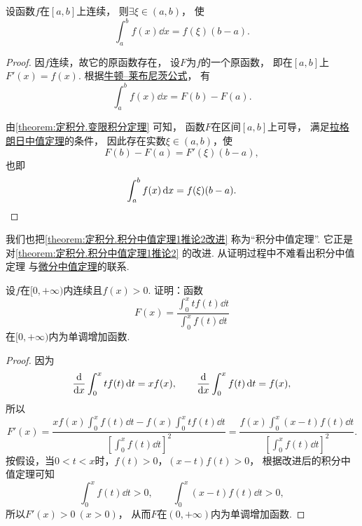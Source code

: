 \begin{proposition}\label{theorem:定积分.积分中值定理1推论2改进}
设函数\(f\)在\([a,b]\)上连续，
则\(\exists\xi\in(a,b)\)，
使\[
	\int_a^b f(x) \dd{x} = f(\xi) (b-a).
\]
\begin{proof}
因\(f\)连续，故它的原函数存在，
设\(F\)为\(f\)的一个原函数，
即在\([a,b]\)上\(F'(x) = f(x)\).
根据\hyperref[equation:定积分.牛顿--莱布尼茨公式]{牛顿--莱布尼茨公式}，
有\[
	\int_a^b f(x) \dd{x}
	= F(b) - F(a).
\]

由\cref{theorem:定积分.变限积分定理} 可知，
函数\(F\)在区间\([a,b]\)上可导，
满足\hyperref[theorem:微分中值定理.拉格朗日中值定理]{拉格朗日中值定理}的条件，
因此存在实数\(\xi\in(a,b)\)，使\[
	F(b) - F(a) = F'(\xi) (b-a),
\]
也即\[
	\int_a^b f(x) \dd{x} = f(\xi) (b-a).
	\qedhere
\]
\end{proof}
\end{proposition}
\begin{remark}
我们也把\cref{theorem:定积分.积分中值定理1推论2改进} 称为“积分中值定理”.
它正是对\cref{theorem:定积分.积分中值定理1推论2} 的改进.
从证明过程中不难看出积分中值定理
与\hyperref[theorem:微分中值定理.拉格朗日中值定理]{微分中值定理}的联系.
\end{remark}

\begin{example}
\def\fu{\displaystyle \int_0^x t f(t) \dd{t}}
\def\fv{\displaystyle \int_0^x f(t) \dd{t}}
\def\fvv{\left[ \fv \right]^2}
\def\fw{\displaystyle \int_0^x (x-t) f(t) \dd{t}}
设\(f\)在\([0,+\infty)\)内连续且\(f(x) > 0\).
证明：函数\[
	F(x) = \frac{\fu}{\fv}
\]在\([0,+\infty)\)内为单调增加函数.
\begin{proof}
因为\[
	\dv{x} \fu = x f(x),
	\qquad
	\dv{x} \fv = f(x),
\]
所以\[
	F'(x) = \frac{x f(x) \fv - f(x) \fu}{\fvv}
	= \frac{f(x) \fw}{\fvv}.
\]
按假设，当\(0 < t < x\)时，\(f(t) > 0\)，\((x-t) f(t) > 0\)，
根据改进后的积分中值定理可知\[
	\fv > 0, \qquad \fw > 0,
\]
所以\(F'(x) > 0\ (x > 0)\)，
从而\(F\)在\((0,+\infty)\)内为单调增加函数.
\end{proof}
\end{example}

